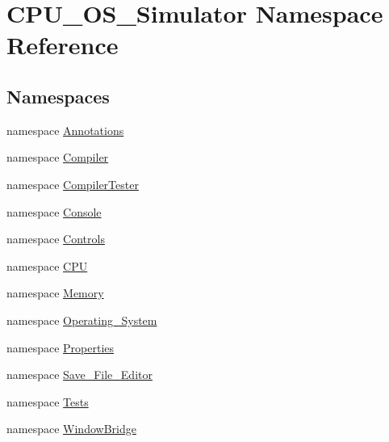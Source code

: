 \hypertarget{namespace_c_p_u___o_s___simulator}{}\section{C\+P\+U\+\_\+\+O\+S\+\_\+\+Simulator Namespace Reference}
\label{namespace_c_p_u___o_s___simulator}
\subsection*{Namespaces}
\begin{DoxyCompactItemize}
\item 
namespace \hyperlink{namespace_c_p_u___o_s___simulator_1_1_annotations}{Annotations}
\item 
namespace \hyperlink{namespace_c_p_u___o_s___simulator_1_1_compiler}{Compiler}
\item 
namespace \hyperlink{namespace_c_p_u___o_s___simulator_1_1_compiler_tester}{Compiler\+Tester}
\item 
namespace \hyperlink{namespace_c_p_u___o_s___simulator_1_1_console}{Console}
\item 
namespace \hyperlink{namespace_c_p_u___o_s___simulator_1_1_controls}{Controls}
\item 
namespace \hyperlink{namespace_c_p_u___o_s___simulator_1_1_c_p_u}{C\+P\+U}
\item 
namespace \hyperlink{namespace_c_p_u___o_s___simulator_1_1_memory}{Memory}
\item 
namespace \hyperlink{namespace_c_p_u___o_s___simulator_1_1_operating___system}{Operating\+\_\+\+System}
\item 
namespace \hyperlink{namespace_c_p_u___o_s___simulator_1_1_properties}{Properties}
\item 
namespace \hyperlink{namespace_c_p_u___o_s___simulator_1_1_save___file___editor}{Save\+\_\+\+File\+\_\+\+Editor}
\item 
namespace \hyperlink{namespace_c_p_u___o_s___simulator_1_1_tests}{Tests}
\item 
namespace \hyperlink{namespace_c_p_u___o_s___simulator_1_1_window_bridge}{Window\+Bridge}
\end{DoxyCompactItemize}
